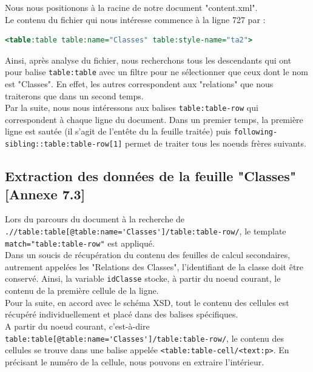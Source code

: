 \documentclass[11pt]{report}
\begin{document}
Nous nous positionons à la racine de notre document "content.xml".\\

Le contenu du fichier qui nous intéresse commence à la ligne 727 par :
\begin{lstlisting}[language=XSLT]
<table:table table:name="Classes" table:style-name="ta2">
\end{lstlisting}

Ainsi, après analyse du fichier, nous recherchons tous les descendants qui ont pour balise \lstinline{table:table} avec un filtre pour ne sélectionner que ceux dont le nom est "Classes". En effet, les autres correspondent aux "relations" que nous traiterons que dans un second temps.\\

Par la suite, nous nous intéressons aux balises \lstinline{table:table-row} qui correspondent à chaque ligne du document.
Dans un premier temps, la première ligne est sautée (il s'agit de l'entête du la feuille traitée) puis \lstinline{following-sibling::table:table-row[1]} permet de traiter tous les noeuds frères suivants.



\subsection{Extraction des données de la feuille "Classes" [Annexe 7.3] }

Lors du parcours du document à la recherche de \lstinline{.//table:table[@table:name='Classes']/table:table-row/}, le template \lstinline{match="table:table-row"} est appliqué.\\

Dans un soucis de récupération du contenu des feuilles de calcul secondaires, autrement appelées les "Relations des Classes", l'identifiant de la classe doit être conservé. Ainsi, la variable \lstinline{idClasse} stocke, à partir du noeud courant, le contenu de la première cellule de la ligne.\\

Pour la suite, en accord avec le schéma XSD, tout le contenu des cellules est récupéré individuellement et placé dans des balises spécifiques.\\
A partir du noeud courant, c'est-à-dire \lstinline{table:table[@table:name='Classes']/table:table-row/}, le contenu des cellules se trouve dans une balise appelée \lstinline{<table:table-cell/<text:p>}. En précisant le numéro de la cellule, nous pouvons en extraire l'intérieur.\\
\end{document}
